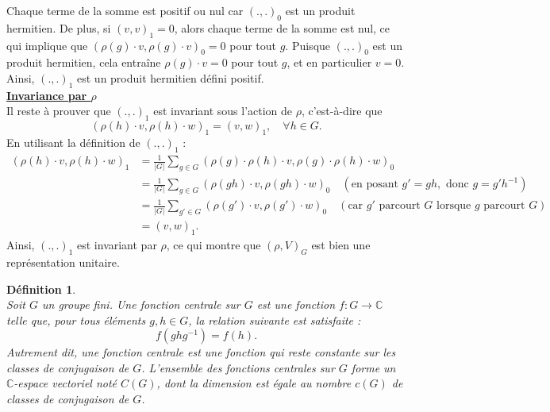 \documentclass[a4paper, 14pt]{report}
\newtheorem{definition}{Définition}[section]
\begin{document}
\begin{onehalfspace}
{\[			\]
			Chaque terme de la somme est positif ou nul car \( (.,.)_0 \) est un produit hermitien. De plus, si \( (v, v)_1 = 0 \), alors chaque terme de la somme est nul, ce qui implique que \( (\rho(g) \cdot v, \rho(g) \cdot v)_0 = 0 \) pour tout \( g \). Puisque \( (.,.)_0 \) est un produit hermitien, cela entraîne \( \rho(g) \cdot v = 0 \) pour tout \( g \), et en particulier \( v = 0 \). Ainsi, \( (.,.)_1 \) est un produit hermitien défini positif.\\
			\textbf{\underline{Invariance par \( \rho \)} }\\
			Il reste à prouver que \( (.,.)_1 \) est invariant sous l'action de \( \rho \), c’est-à-dire que  
			\[
			(\rho(h) \cdot v, \rho(h) \cdot w)_1 = (v, w)_1, \quad \forall h \in G.
			\]
			En utilisant la définition de \( (.,.)_1 \) :
			\begin{align*}
				(\rho(h) \cdot v, \rho(h) \cdot w)_1 
				&= \frac{1}{|G|} \sum_{g \in G} (\rho(g) \cdot \rho(h) \cdot v, \rho(g) \cdot \rho(h) \cdot w)_0 \\
				&= \frac{1}{|G|} \sum_{g \in G} (\rho(gh) \cdot v, \rho(gh) \cdot w)_0 \quad (\text{en posant } g' = gh, \text{ donc } g = g' h^{-1}) \\
				&= \frac{1}{|G|} \sum_{g' \in G} (\rho(g') \cdot v, \rho(g') \cdot w)_0 \quad (\text{car } g' \text{ parcourt } G \text{ lorsque } g \text{ parcourt } G) \\
				&= (v, w)_1.
			\end{align*}
			Ainsi, \( (.,.)_1 \) est invariant par \( \rho \), ce qui montre que \( (\rho, V)_G \) est bien une représentation unitaire.
			
			
			\begin{definition} \cite{serre1971representation} \\
				Soit $G$ un groupe fini. Une fonction centrale sur $G$ est une fonction $f : G \to \mathbb{C}$ telle que, pour tous éléments $g, h \in G$, la relation suivante est satisfaite :
				\[
				f(ghg^{-1}) = f(h).
				\]
				Autrement dit, une fonction centrale est une fonction qui reste constante sur les classes de conjugaison de $G$. L'ensemble des fonctions centrales sur $G$ forme un $\mathbb{C}$-espace vectoriel noté $C(G)$, dont la dimension est égale au nombre $c(G)$ de classes de conjugaison de $G$. 	
			\end{definition}
			
}
\end{onehalfspace}
\end{document}
